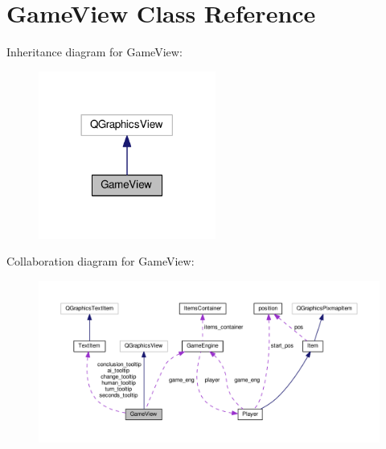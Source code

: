 \hypertarget{class_game_view}{}\section{Game\+View Class Reference}
\label{class_game_view}


Inheritance diagram for Game\+View\+:
\nopagebreak
\begin{figure}[H]
\begin{center}
\leavevmode
\includegraphics[width=165pt]{class_game_view__inherit__graph}
\end{center}
\end{figure}


Collaboration diagram for Game\+View\+:
\nopagebreak
\begin{figure}[H]
\begin{center}
\leavevmode
\includegraphics[width=350pt]{class_game_view__coll__graph}
\end{center}
\end{figure}
